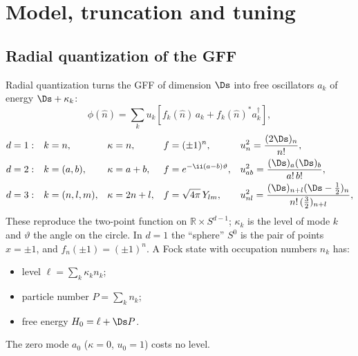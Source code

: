 \section{Model, truncation and tuning}\label{sec:model}

\subsection{Radial quantization of the GFF}
Radial quantization turns the GFF of dimension $\Ds$ into free oscillators $a_k$ of energy $\Ds+\kappa_k$:
\begin{equation}
 \phi(\hat n)=\sum_k u_k\left[f_k(\hat n)\,a_k+f_k(\hat n)^*a_k^\dagger\right],
 \label{eq:modes}
\end{equation}
\begin{equation}
\begin{aligned}
 d=1:&\quad k=n,&&\kappa=n,&&f=(\pm1)^n,&&u_n^2=\frac{(2\Ds)_n}{n!},\\
 d=2:&\quad k=(a,b),&&\kappa=a+b,&&f=e^{-\ii(a-b)\vartheta},&&u_{ab}^2=\frac{(\Ds)_a(\Ds)_b}{a!\,b!},\\
 d=3:&\quad k=(n,l,m),&&\kappa=2n+l,&&f=\sqrt{4\pi}\,Y_{lm},&&u_{nl}^2=\frac{(\Ds)_{n+l}(\Ds-\frac12)_n}{n!\,(\frac32)_{n+l}},
\end{aligned}
\label{eq:weights}
\end{equation}
These reproduce the two-point function on $\mathbb R\times S^{d-1}$; $\kappa_k$ is the level of mode $k$ and
$\vartheta$ the angle on the circle. In $d=1$ the ``sphere'' $S^0$ is the pair of points $x=\pm1$, and
$f_n(\pm1)=(\pm1)^n$. A Fock state with occupation numbers $n_k$ has:
\begin{itemize}
\item level $\ell=\sum_k\kappa_k n_k$;
\item particle number $P=\sum_k n_k$;
\item free energy $H_0=\ell+\Ds P$.
\end{itemize}
The zero mode $a_0$ ($\kappa=0$, $u_0=1$) costs no level.

